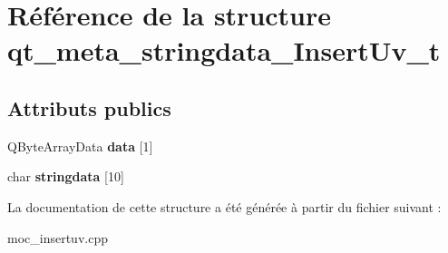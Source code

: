 \hypertarget{structqt__meta__stringdata___insert_uv__t}{\section{Référence de la structure qt\+\_\+meta\+\_\+stringdata\+\_\+\+Insert\+Uv\+\_\+t}
\label{structqt__meta__stringdata___insert_uv__t}
}
\subsection*{Attributs publics}
\begin{DoxyCompactItemize}
\item 
\hypertarget{structqt__meta__stringdata___insert_uv__t_a56bcae759c1d2f4bc62388aa48578642}{Q\+Byte\+Array\+Data {\bfseries data} \mbox{[}1\mbox{]}}\label{structqt__meta__stringdata___insert_uv__t_a56bcae759c1d2f4bc62388aa48578642}

\item 
\hypertarget{structqt__meta__stringdata___insert_uv__t_aa5aea9c059c9f16fa76c554ca0722d10}{char {\bfseries stringdata} \mbox{[}10\mbox{]}}\label{structqt__meta__stringdata___insert_uv__t_aa5aea9c059c9f16fa76c554ca0722d10}

\end{DoxyCompactItemize}


La documentation de cette structure a été générée à partir du fichier suivant \+:\begin{DoxyCompactItemize}
\item 
moc\+\_\+insertuv.\+cpp\end{DoxyCompactItemize}
